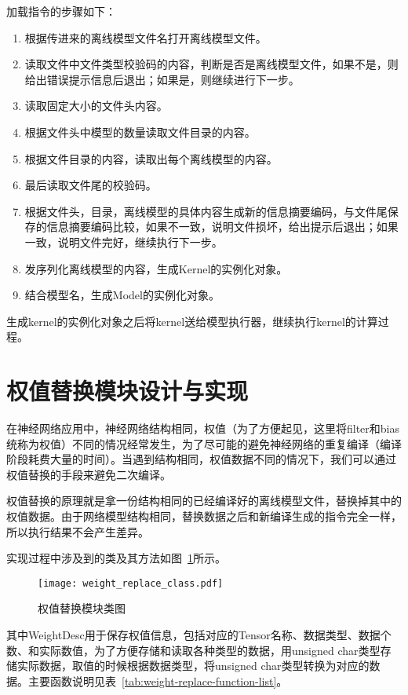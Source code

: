 加载指令的步骤如下：
\begin{enumerate}
  \item 根据传进来的离线模型文件名打开离线模型文件。
  \item 读取文件中文件类型校验码的内容，判断是否是离线模型文件，如果不是，则给出错误提示信息后退出；如果是，则继续进行下一步。
  \item 读取固定大小的文件头内容。
  \item 根据文件头中模型的数量读取文件目录的内容。
  \item 根据文件目录的内容，读取出每个离线模型的内容。
  \item 最后读取文件尾的校验码。
  \item 根据文件头，目录，离线模型的具体内容生成新的信息摘要编码，与文件尾保存的信息摘要编码比较，如果不一致，说明文件损坏，给出提示后退出；如果一致，说明文件完好，继续执行下一步。
  \item 发序列化离线模型的内容，生成Kernel的实例化对象。
  \item 结合模型名，生成Model的实例化对象。
\end{enumerate}
生成kernel的实例化对象之后将kernel送给模型执行器，继续执行kernel的计算过程。

\section {权值替换模块设计与实现}
在神经网络应用中，神经网络结构相同，权值（为了方便起见，这里将filter和bias统称为权值）不同的情况经常发生，为了尽可能的避免神经网络的重复编译（编译阶段耗费大量的时间）。当遇到结构相同，权值数据不同的情况下，我们可以通过权值替换的手段来避免二次编译。

权值替换的原理就是拿一份结构相同的已经编译好的离线模型文件，替换掉其中的权值数据。由于网络模型结构相同，替换数据之后和新编译生成的指令完全一样，所以执行结果不会产生差异。

实现过程中涉及到的类及其方法如图~\ref{fig:weight-replace-class}所示。

\begin{figure}[htb]
  \centering
  \texttt{[image: weight\_replace\_class.pdf]}
  \caption{权值替换模块类图}
  \label{fig:weight-replace-class}
\end{figure}

其中WeightDesc用于保存权值信息，包括对应的Tensor名称、数据类型、数据个数、和实际数值，为了方便存储和读取各种类型的数据，用unsigned char类型存储实际数据，取值的时候根据数据类型，将unsigned char类型转换为对应的数据。主要函数说明见表~\ref{tab:weight-replace-function-list}。


